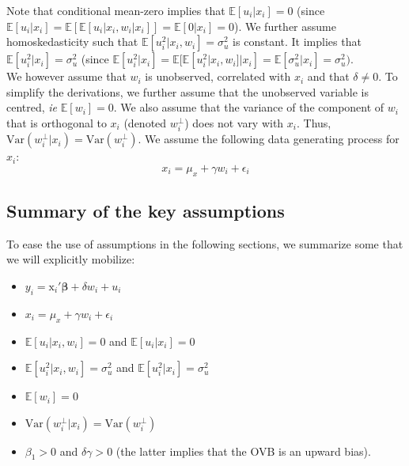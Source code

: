 \documentclass[a4paper, 11pt]{report}
\begin{document}
				Note that conditional mean-zero implies that $\mathbb{E}[u_{i} | x_{i}] = 0$ (since $\mathbb{E}[u_{i} | x_{i}] = \mathbb{E}[\mathbb{E}[u_{i} | x_{i}, w_{i}| x_{i}]]  = \mathbb{E}[0 | x_{i}] = 0$). We further assume homoskedasticity such that $\mathbb{E}[u_i^{2} | x_{i}, w_{i}] = \sigma_{u}^{2}$ is constant. It implies that  $\mathbb{E}[u_i^{2} | x_{i}] = \sigma_{u}^{2}$ (since $\mathbb{E}[u_i^{2} | x_{i}] =  \mathbb{E}[\mathbb{E}[u_i^{2} | x_{i}, w_{i}]|x_{i}] = \mathbb{E}[\sigma_{u}^{2} | x_{i}] = \sigma_{u}^{2})$.\\
			
			We however assume that $w_{i}$ is unobserved, correlated with $x_{i}$ and that $\delta \neq 0$. To simplify the derivations, we further assume that the unobserved variable is centred, \textit{ie} $\mathbb{E}[w_i] = 0$. We also assume that the variance of the component of $w_{i}$ that is orthogonal to $x_{i}$ (denoted $w_{i}^{\perp}$) does not vary with $x_{i}$. Thus, $\text{Var}(w_{i}^{\perp}|x_{i}) = \text{Var}(w_{i}^{\perp})$. We assume the following data generating process for $x_i$:
				~
				\begin{equation}\label{maths_dgp_x}
					x_i = \mu_{x} + \gamma w_{i} + \epsilon_i
				\end{equation}
							
			
	
									
									
		\subsection{Summary of the key assumptions}
		
			To ease the use of assumptions in the following sections, we summarize some that we will explicitly mobilize:
		 
			\begin{itemize}
				\item $y_i = \text{x}_i' \bm{\beta} + \delta w_{i} + u_i$
				\item $x_i = \mu_x + \gamma w_{i} + \epsilon_i$
				\item $\mathbb{E}[u_{i} | x_{i}, w_{i}] = 0$ and $\mathbb{E}[u_{i} | x_{i}] = 0$
				\item $\mathbb{E}[u_i^{2} | x_{i}, w_{i}] = \sigma_{u}^{2}$ and $\mathbb{E}[u_i^{2} | x_{i}] = \sigma_{u}^{2}$
				\item $\mathbb{E}[w_i] = 0$
				\item $\text{Var}(w_{i}^{\perp}|x_{i}) = \text{Var}(w_{i}^{\perp})$
				\item $\beta_{1} > 0$ and $\delta\gamma > 0$ (the latter implies that the OVB is an upward bias).
			\end{itemize}
				
\end{document}
